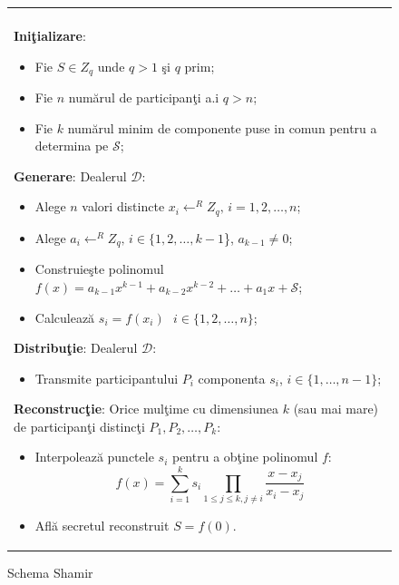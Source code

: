 \documentclass{llncs}
\begin{document}
\begin{figure}[h!]

\begin{tabular}{|p{\textwidth}|}
\hline

\\
\hspace{.1in}
\textbf{Ini\c{t}ializare}: 
	\begin{itemize}
		\item Fie $S \in Z_q$ unde $q > 1 $ \c{s}i $q$ prim;
		\item Fie $n$ num\u{a}rul de participan\c{t}i a.i $q > n$;
		\item Fie $k$ num\u{a}rul minim de componente puse in comun pentru a determina pe $\mathcal{S}$;
	\end{itemize}
\medskip

\hspace{.1in}
\textbf{Generare}: Dealerul $\mathcal{D}$:
	\begin{itemize}
		\item Alege $n$ valori distincte $x_i \leftarrow^R Z_q \text{, }i = 1,2,\dots,n$;
		\item Alege $a_{i} \leftarrow^R Z_q \text{, }i \in \{1,2,\dots,{k - 1}$\}, $a_{k-1} \neq 0$;
		\item Construie\c{s}te polinomul $f(x) = a_{k - 1}x ^ {k-1} + a_{k-2}x ^ {k - 2} + \dots + a_1x + \mathcal{S}$;
		\item Calculeaz\u{a} $s_i = f(x_i) \text{ } i \in \{1,2,\dots,n\}$;
	\end{itemize}
\medskip

\hspace{.1in}
\textbf{Distribu\c{t}ie}: Dealerul $\mathcal{D}$:
	\begin{itemize}
		\item Transmite participantului $P_i$ componenta $s_i$, $i \in \{1,\dots,n-1\}$;
	\end{itemize}

\hspace{.1in}
\textbf{Reconstruc\c{t}ie}: Orice mul\c{t}ime cu dimensiunea $k$ (sau mai mare) de participan\c{t}i distinc\c{t}i $P_1, P_2, \dots, P_k$:
	\begin{itemize}
		\setlength{\itemsep}{5pt}
		\item Interpoleaz\u{a} punctele $s_i$ pentru a ob\c{t}ine polinomul $f$:
		\begin{equation} f(x)=\sum_{i=1}^{k} {s_i}\prod_{1 \leq j \leq k, j \neq i} \frac{x-x_j}{x_i-x_j} \end{equation}
		\item Afl\u{a} secretul reconstruit $S = f(0)$.
	\end{itemize}

\\
\hline
\end{tabular}

\caption{Schema Shamir \cite{S:1979}}
\label{fig:shamir_scheme}
\end{figure}
\end{document}
